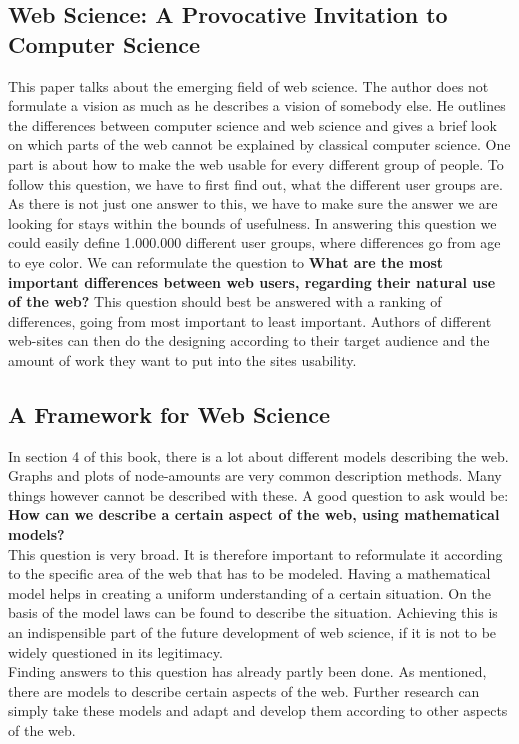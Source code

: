 \documentclass{sig-alternate-05-2015}
\begin{document}
\subsection{Web Science: A Provocative Invitation to Computer Science \cite{paper2}}
This paper talks about the emerging field of web science. The author does not formulate a vision as much as he describes a vision of somebody else. He outlines the differences between computer science and web science and gives a brief look on which parts of the web cannot be explained by classical computer science. One part is about how to make the web usable for every different group of people. To follow this question, we have to first find out, what the different user groups are. As there is not just one answer to this, we have to make sure the answer we are looking for stays within the bounds of usefulness. In answering this question we could easily define 1.000.000 different user groups, where differences go from age to eye color. We can reformulate the question to {\bf What are the most important differences between web users, regarding their natural use of the web?} This question should best be answered with a ranking of differences, going from most important to least important. Authors of different web-sites can then do the designing according to their target audience and the amount of work they want to put into the sites usability.

\subsection{A Framework for Web Science \cite{paper3}}
In section 4 of this book, there is a lot about different models describing the web. Graphs and plots of node-amounts are very common description methods. Many things however cannot be described with these. A good question to ask would be: {\bf How can we describe a certain aspect of the web, using mathematical models?} \\
This question is very broad. It is therefore important to reformulate it according to the specific area of the web that has to be modeled. Having a mathematical model helps in creating a uniform understanding of a certain situation. On the basis of the model laws can be found to describe the situation. Achieving this is an indispensible part of the future development of web science, if it is not to be widely questioned in its legitimacy.\\
Finding answers to this question has already partly been done. As mentioned, there are models to describe certain aspects of the web. Further research can simply take these models and adapt and develop them according to other aspects of the web.
\end{document}

